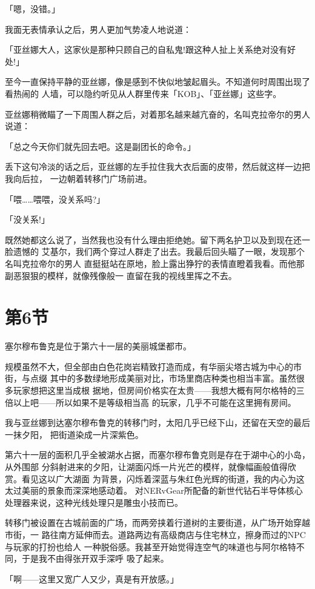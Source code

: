 \documentclass[11pt]{book}
\begin{document}
「嗯，没错。」

我面无表情承认之后，男人更加气势凌人地说道：

「亚丝娜大人，这家伙是那种只顾自己的自私鬼!跟这种人扯上关系绝对没有好处!」

至今一直保持平静的亚丝娜，像是感到不快似地皱起眉头。不知道何时周围出现了看热闹的
人墙，可以隐约听见从人群里传来「KOB」、「亚丝娜」这些字。

亚丝娜稍微瞄了一下周围人群之后，对着那名越来越亢奋的，名叫克拉帝尔的男人说道：

「总之今天你们就先回去吧。这是副团长的命令。」

丢下这句冷淡的话之后，亚丝娜的左手拉住我大衣后面的皮带，然后就这样一边把我向后拉，
一边朝着转移门广场前进。

「喂……喂喂，没关系吗?」

「没关系!」

既然她都这么说了，当然我也没有什么理由拒绝她。留下两名护卫以及到现在还一脸遗憾的
艾基尔，我们两个穿过人群走了出去。我最后回头瞄了一眼，发现那个名叫克拉帝尔的男人
直挺挺站在原地，脸上露出狰狞的表情直瞪着我看。而他那副恶狠狠的模样，就像残像般一
直留在我的视线里挥之不去。
\section{第6节}
\label{sec:org06ead85}
塞尔穆布鲁克是位于第六十一层的美丽城堡都市。

规模虽然不大，但全部由白色花岗岩精致打造而成，有华丽尖塔古城为中心的市街，与点缀
其中的多数绿地形成美丽对比，市场里商店种类也相当丰富。虽然很多玩家想把这里当成根
据地，但房间价格实在太贵——我想大概有阿尔格特的三倍以上吧——所以如果不是等级相当高
的玩家，几乎不可能在这里拥有房间。

我与亚丝娜到达塞尔穆布鲁克的转移门时，太阳几乎已经下山，还留在天空的最后一抹夕阳，
把街道染成一片深紫色。

第六十一层的面积几乎全被湖水占据，而塞尔穆布鲁克则是存在于湖中心的小岛，从外围部
分斜射进来的夕阳，让湖面闪烁一片光芒的模样，就像幅画般值得欣赏。看见这以广大湖面
为背景，闪烁着深蓝与朱红色光辉的街道，我的内心为这太过美丽的景象而深深地感动着。
对NERvGear所配备的新世代钻石半导体核心处理器来说，这种光线处理只是雕虫小技而已。

转移门被设置在古城前面的广场，而两旁挟着行道树的主要街道，从广场开始穿越市街，一
路往南方延伸而去。道路两边有高级商店与住宅林立，擦身而过的NPC与玩家的打扮也给人
一种脱俗感。我甚至开始觉得连空气的味道也与阿尔格特不同，于是我不由得张开双手深呼
吸了起来。

「啊——这里又宽广人又少，真是有开放感。」
\end{document}
